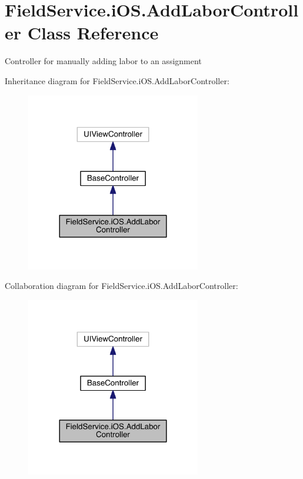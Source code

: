 \hypertarget{class_field_service_1_1i_o_s_1_1_add_labor_controller}{\section{Field\+Service.\+i\+O\+S.\+Add\+Labor\+Controller Class Reference}
\label{class_field_service_1_1i_o_s_1_1_add_labor_controller}
}


Controller for manually adding labor to an assignment  




Inheritance diagram for Field\+Service.\+i\+O\+S.\+Add\+Labor\+Controller\+:
\nopagebreak
\begin{figure}[H]
\begin{center}
\leavevmode
\includegraphics[width=216pt]{class_field_service_1_1i_o_s_1_1_add_labor_controller__inherit__graph}
\end{center}
\end{figure}


Collaboration diagram for Field\+Service.\+i\+O\+S.\+Add\+Labor\+Controller\+:
\nopagebreak
\begin{figure}[H]
\begin{center}
\leavevmode
\includegraphics[width=216pt]{class_field_service_1_1i_o_s_1_1_add_labor_controller__coll__graph}
\end{center}
\end{figure}
